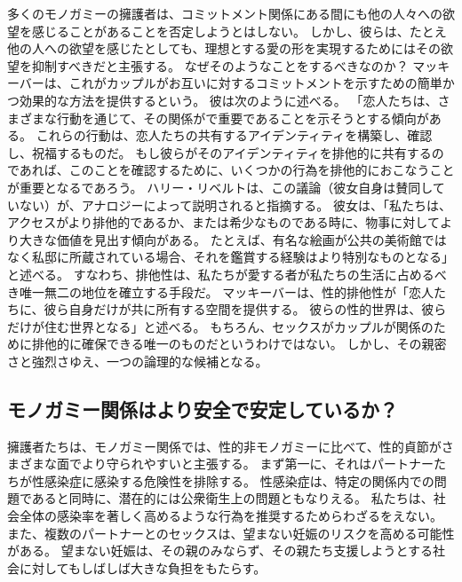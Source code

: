 \documentclass[paper=a4,book,openany]{jlreq}
\begin{document}
多くのモノガミーの擁護者は、コミットメント関係にある間にも他の人々への欲望を感じることがあることを否定しようとはしない。
しかし、彼らは、たとえ他の人への欲望を感じたとしても、理想とする愛の形を実現するためにはその欲望を抑制すべきだと主張する。
なぜそのようなことをするべきなのか？ マッキーバーは、これがカップルがお互いに対するコミットメントを示すための簡単かつ効果的な方法を提供するという。
彼は次のように述べる。
「恋人たちは、さまざまな行動を通じて、その関係がで重要であることを示そうとする傾向がある。
これらの行動は、恋人たちの共有するアイデンティティを構築し、確認し、祝福するものだ。
もし彼らがそのアイデンティティを排他的に共有するのであれば、このことを確認するために、いくつかの行為を排他的におこなうことが重要となるであろう\citep[p.361]{mckeever17:_is_requir_sexual_exclus_consis_roman_love}。
ハリー・リベルトは、この議論（彼女自身は賛同していない）が、アナロジーによって説明されると指摘する。
彼女は、「私たちは、アクセスがより排他的であるか、または希少なものである時に、物事に対してより大きな価値を見出す傾向がある。
たとえば、有名な絵画が公共の美術館ではなく私邸に所蔵されている場合、それを鑑賞する経験はより特別なものとなる」と述べる\citep[p.410]{liberto17:_prob_sexual_prom}。
すなわち、排他性は、私たちが愛する者が私たちの生活に占めるべき唯一無二の地位を確立する手段だ。
マッキーバーは、性的排他性が「恋人たちに、彼ら自身だけが共に所有する空間を提供する。
彼らの性的世界は、彼らだけが住む世界となる」と述べる\citep[p.61]{mckeever17:_is_requir_sexual_exclus_consis_roman_love}。
もちろん、セックスがカップルが関係のために排他的に確保できる唯一のものだというわけではない。
しかし、その親密さと強烈さゆえ、一つの論理的な候補となる\citep[p.6]{york19:_why_monog_is_moral_permis}。

\subsection{モノガミー関係はより安全で安定しているか？}

擁護者たちは、モノガミー関係では、性的非モノガミーに比べて、性的貞節がさまざまな面でより守られやすいと主張する。
まず第一に、それはパートナーたちが性感染症に感染する危険性を排除する。
性感染症は、特定の関係内での問題であると同時に、潜在的には公衆衛生上の問題ともなりえる。
私たちは、社会全体の感染率を著しく高めるような行為を推奨するためらわざるをえない。
また、複数のパートナーとのセックスは、望まない妊娠のリスクを高める可能性がある。
望まない妊娠は、その親のみならず、その親たち支援しようとする社会に対してもしばしば大きな負担をもたらす。
\end{document}
